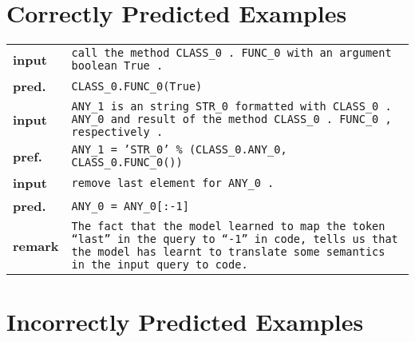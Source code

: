\documentclass{article}
\begin{document}
  \section{Correctly Predicted Examples}

  \begin{tabular}{ l p{}}
    \hline
		\textbf{input} & \texttt{call the method CLASS\_0 . FUNC\_0 with an argument boolean True .} \\
    \textbf{pred.} & \texttt{CLASS\_0.FUNC\_0(True)} \\
    \hline
		\textbf{input} & \texttt{ANY\_1 is an string STR\_0 formatted with CLASS\_0 . ANY\_0 and 
                      result of the method CLASS\_0 . FUNC\_0 , respectively .}	\\
		\textbf{pref.} & \texttt{ANY\_1 = 'STR\_0' \% (CLASS\_0.ANY\_0, CLASS\_0.FUNC\_0())} \\
    \hline
    \textbf{input} & \texttt{remove last element for ANY\_0 .} \\
    \textbf{pred.} & \texttt{ANY\_0 = ANY\_0[:-1]} \\
    \textbf{remark}& \texttt{The fact that the model learned to map the token ``last'' in the 
                     query to ``-1'' in code, tells us that the model has learnt to translate some 
                     semantics in the input query to code.} \\
    \hline
  \end{tabular}

  \section{Incorrectly Predicted Examples}
\end{document}
